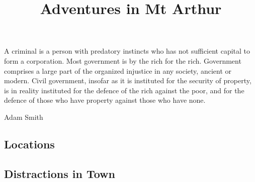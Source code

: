 \documentclass[a4paper,openany]{book}
\title{Adventures in Mt Arthur}
\begin{document}
%



\mainmatter

\startcontents[Town]
\startcontents[Villages]
\startcontents[Forest]
\stopcontents[Town]
\stopcontents[Villages]
\stopcontents[Forest]



\chapter{}
\epigraph{A criminal is a person with predatory instincts who has not sufficient capital to form a corporation. Most government is by the rich for the rich.
Government comprises a large part of the organized injustice in any society, ancient or modern.
Civil government, insofar as it is instituted for the security of property, is in reality instituted for the defence of the rich against the poor, and for the defence of those who have property against those who have none.}%
{Adam Smith}

\section{Locations}

\begin{multicols}{2}













\end{multicols}

\section{Distractions in Town}


\renewcommand{\sqarea}{Town}

\begin{multicols}{2}











\end{multicols}
\end{document}
